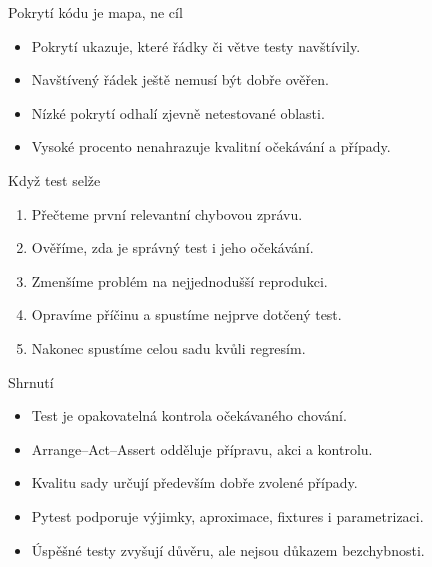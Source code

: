 \documentclass[aspectratio=169]{beamer}
\begin{document}
\begin{frame}{Pokrytí kódu je mapa, ne cíl}
\begin{itemize}
\item Pokrytí ukazuje, které řádky či větve testy navštívily.
\item Navštívený řádek ještě nemusí být dobře ověřen.
\item Nízké pokrytí odhalí zjevně netestované oblasti.
\item Vysoké procento nenahrazuje kvalitní očekávání a případy.
\end{itemize}
\end{frame}

\begin{frame}{Když test selže}
\begin{enumerate}
\item Přečteme první relevantní chybovou zprávu.
\item Ověříme, zda je správný test i jeho očekávání.
\item Zmenšíme problém na nejjednodušší reprodukci.
\item Opravíme příčinu a spustíme nejprve dotčený test.
\item Nakonec spustíme celou sadu kvůli regresím.
\end{enumerate}
\end{frame}

\begin{frame}{Shrnutí}
\begin{itemize}
\item Test je opakovatelná kontrola očekávaného chování.
\item Arrange--Act--Assert odděluje přípravu, akci a kontrolu.
\item Kvalitu sady určují především dobře zvolené případy.
\item Pytest podporuje výjimky, aproximace, fixtures i parametrizaci.
\item Úspěšné testy zvyšují důvěru, ale nejsou důkazem bezchybnosti.
\end{itemize}
\end{frame}
\end{document}
